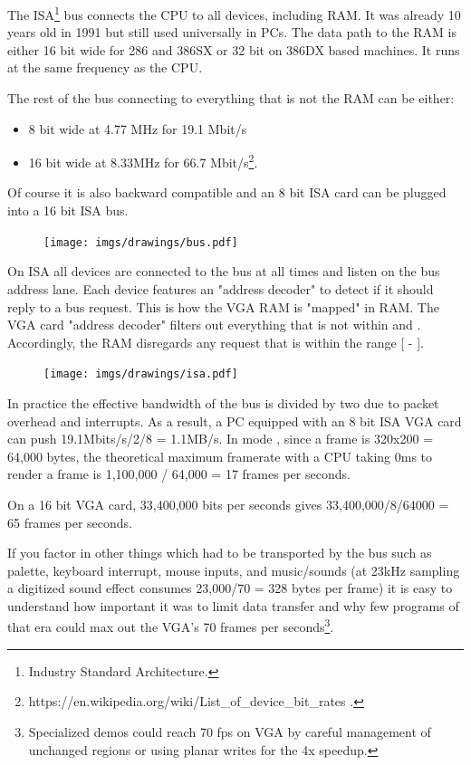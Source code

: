 \documentclass[book.tex]{subfiles}
\begin{document}
The ISA\footnote{Industry Standard Architecture.} bus connects the CPU to all devices, including RAM. It was already 10 years old in 1991 but still used universally in PCs. The data path to the RAM is either 16 bit wide for 286 and 386SX or 32 bit on 386DX based machines. It runs at the same frequency as the CPU.\\
\par
The rest of the bus connecting to everything that is not the RAM can be either:
\begin{itemize}
\item 8 bit wide at 4.77 MHz  for 19.1 Mbit/s
\item 16 bit wide at 8.33MHz for 66.7 Mbit/s\footnote{https://en.wikipedia.org/wiki/List\_of\_device\_bit\_rates .}.
\end{itemize}
Of course it is also backward compatible and an 8 bit ISA card can be plugged into a 16 bit ISA bus.\\
\par
\begin{figure}[H]
\centering
      \texttt{[image: imgs/drawings/bus.pdf]}
\end{figure}
\par
{} On ISA all devices are connected to the bus at all times and listen on the bus address lane. Each device features an "address decoder" to detect if it should reply to a bus request. This is how the VGA RAM is "mapped" in RAM. The VGA card "address decoder"  filters out everything that is not within  and . Accordingly, the RAM disregards any request that is within the range [ - ].\\
\par
 \begin{figure}[H]
\centering
\texttt{[image: imgs/drawings/isa.pdf]}
\end{figure}

\par
 In practice the effective bandwidth of the bus is divided by two due to packet overhead and interrupts. As a result, a PC equipped with an 8 bit ISA VGA card can push 19.1Mbits/s/2/8 = 1.1MB/s. In mode , since a frame is 320x200 = 64,000 bytes, the theoretical maximum framerate with a CPU taking 0ms to render a frame is 1,100,000 / 64,000 = 17 frames per seconds.\\
 \par
 On a 16 bit VGA card, 33,400,000 bits per seconds gives 33,400,000/8/64000 = 65 frames per seconds.\\
 \par
 If you factor in other things which had to be transported by the bus such as palette, keyboard interrupt, mouse inputs, and music/sounds (at 23kHz sampling a digitized sound effect consumes 23,000/70 = 328 bytes per frame) it is easy to understand how important it was to limit data transfer and why few programs of that era could max out the VGA's 70 frames per seconds\footnote{Specialized demos could reach 70 fps on VGA by careful management of unchanged regions or using planar writes for the 4x speedup.}.
\end{document}
